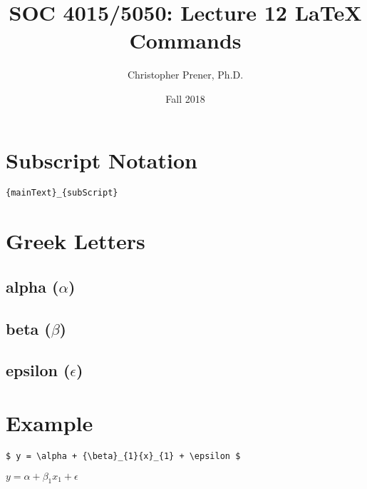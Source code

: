 \documentclass{tufte-handout}
\title{SOC 4015/5050: Lecture 12 LaTeX Commands}
\author{Christopher Prener, Ph.D.}
\date{Fall 2018}
\newenvironment{subs}
  {\adjustwidth{3em}{0pt}}
  {\endadjustwidth}
\begin{document}
\maketitle %

\vspace{5mm}
\section{Subscript Notation}
\noindent \texttt{\{mainText\}\_\{subScript\}}

\vspace{5mm}
\section{Greek Letters}
\begin{subs}
\subsection{alpha ($\alpha$)}

\vspace{3mm}
\subsection{beta ($\beta$)}

\vspace{3mm}
\subsection{epsilon ($\epsilon$)}
\end{subs}

\vspace{5mm}
\section{Example}
\begin{verbatim}
$ y = \alpha + {\beta}_{1}{x}_{1} + \epsilon $
\end{verbatim}

\vspace{3mm}
\noindent \scalebox{2} {$ y = \alpha + {\beta}_{1}{x}_{1} + \epsilon $}

\end{document}
